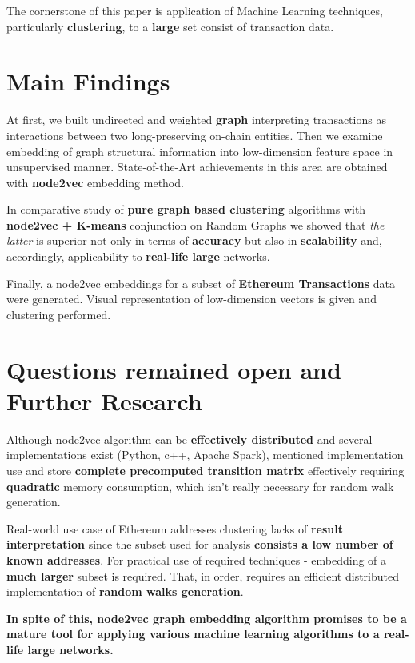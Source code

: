 \Conclusion
The cornerstone of this paper is application of Machine Learning techniques, particularly \textbf{clustering}, to a \textbf{large} set consist of transaction data.

\section{Main Findings}
At first, we built undirected and weighted \textbf{graph} interpreting transactions as interactions between two long-preserving on-chain entities. Then we examine embedding of graph structural information into low-dimension feature space in unsupervised manner. 
State-of-the-Art achievements in this area are obtained with \textbf{node2vec} embedding method. 

In comparative study of \textbf{pure graph based clustering} algorithms with \textbf{node2vec + K-means} conjunction on Random Graphs we showed that \textit{the latter} is superior not only in terms of \textbf{accuracy} but also in \textbf{scalability} and, accordingly, applicability to \textbf{real-life large} networks.

Finally, a node2vec embeddings for a subset of \textbf{Ethereum Transactions} data were generated. Visual representation of low-dimension vectors is given and clustering performed.

\section{Questions remained open and Further Research}
Although node2vec algorithm can be \textbf{effectively distributed} and several implementations exist (Python, c++, Apache Spark), mentioned implementation use and store \textbf{complete precomputed transition matrix} effectively requiring \textbf{quadratic}\cite{DBLP:journals/corr/abs-1805-00280} memory consumption, which isn't really necessary for random walk generation. 

Real-world use case of Ethereum addresses clustering lacks of \textbf{result interpretation} since the subset used for analysis \textbf{consists a low number of known addresses}. For practical use of required techniques - embedding of a \textbf{much larger} subset is required. That, in order, requires an efficient distributed implementation of \textbf{random walks generation}. 

\textbf{In spite of this, node2vec graph embedding algorithm promises to be a mature tool for applying various machine learning algorithms to a real-life large networks.}